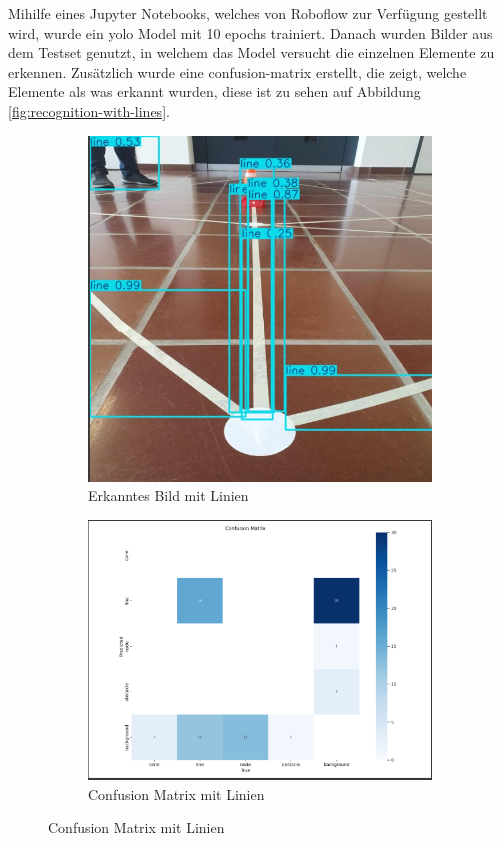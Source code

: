Mihilfe eines Jupyter Notebooks, welches von Roboflow zur Verfügung gestellt wird, wurde ein \gls{yolo} Model mit 10 \gls{epoch}s trainiert. Danach wurden Bilder aus dem Testset genutzt, in welchem das Model versucht die einzelnen Elemente zu erkennen. Zusätzlich wurde eine \gls{confusion-matrix} erstellt, die zeigt, welche Elemente als was erkannt wurden, diese ist zu sehen auf Abbildung \ref{fig:recognition-with-lines}.

\begin{figure}[H]
\centering
\begin{subfigure}{0.4\textwidth}
\centering
\includegraphics[width=0.95\linewidth]{assets/informatik-prototyp/yolo/line-recognitions.png} 
\caption{Erkanntes Bild mit Linien}
\label{fig:image-recognition-with-lines}
\end{subfigure}
\begin{subfigure}{0.59\textwidth}
\centering
\includegraphics[width=0.95\linewidth]{assets/informatik-prototyp/yolo/conf-matrix-lines.png} 
\caption{Confusion Matrix mit Linien}
\label{fig:conf-matrix-lines}
\end{subfigure}


\end{figure}
